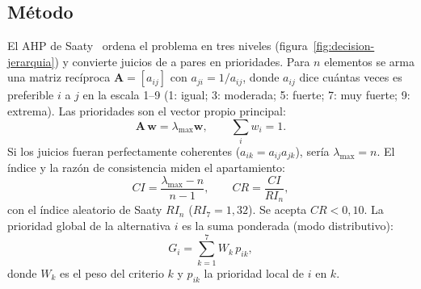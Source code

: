 \subsection{Método}
El AHP de Saaty~\cite{decision-saaty1980,decision-saaty1990} ordena el problema en tres
niveles (figura~\ref{fig:decision-jerarquia}) y convierte juicios de a pares en
prioridades. Para $n$ elementos se arma una matriz recíproca $\mathbf{A}=[a_{ij}]$ con
$a_{ji}=1/a_{ij}$, donde $a_{ij}$ dice cuántas veces es preferible $i$ a $j$ en la escala
1--9 (1: igual; 3: moderada; 5: fuerte; 7: muy fuerte; 9: extrema). Las prioridades son
el vector propio principal:
\begin{equation}
  \mathbf{A}\,\mathbf{w}=\lambda_{\max}\mathbf{w},\qquad \sum_i w_i=1 .
  \label{eq:decision-eig}
\end{equation}
Si los juicios fueran perfectamente coherentes ($a_{ik}=a_{ij}a_{jk}$), sería
$\lambda_{\max}=n$. El índice y la razón de consistencia miden el apartamiento:
\begin{equation}
  CI=\frac{\lambda_{\max}-n}{n-1},\qquad CR=\frac{CI}{RI_n},
  \label{eq:decision-cr}
\end{equation}
con el índice aleatorio de Saaty $RI_n$ ($RI_7=1{,}32$). Se acepta $CR<0{,}10$. La
prioridad global de la alternativa $i$ es la suma ponderada (modo distributivo):
\begin{equation}
  G_i=\sum_{k=1}^{7} W_k\,p_{ik},
  \label{eq:decision-global}
\end{equation}
donde $W_k$ es el peso del criterio $k$ y $p_{ik}$ la prioridad local de $i$ en $k$.

